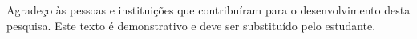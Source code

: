 \begin{agradecimentos}Agradeço às pessoas e instituições que contribuíram para o desenvolvimento desta pesquisa. Este texto é demonstrativo e deve ser substituído pelo estudante.\end{agradecimentos}
